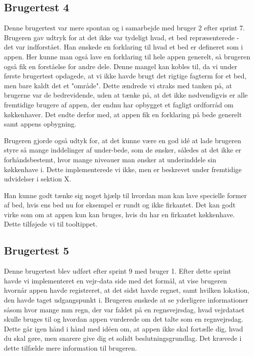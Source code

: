 \subsection{Brugertest 4}

Denne brugertest var mere spontan og i samarbejde med bruger 2 efter sprint 7. Brugeren gav udtryk for at det ikke var tydeligt hvad, et bed repræsenterede - det var indforstået. Han ønskede en forklaring til hvad et bed er defineret som i appen. Her kunne man også lave en forklaring til hele appen generelt, så brugeren også fik en forståelse for andre dele. Denne mangel kan kobles til, da vi under første brugertest opdagede, at vi ikke havde brugt det rigtige fagterm for et bed, men bare kaldt det et "område". Dette ændrede vi straks med tanken på, at brugerne var de bedrevidende, uden at tænke på, at det ikke nødvendigvis er alle fremtidige brugere af appen, der endnu har opbygget et fagligt ordforråd om køkkenhaver. Det endte derfor med, at appen fik en forklaring på bede generelt samt appens opbygning.

Brugeren gjorde også udtyk for, at det kunne være en god idé at lade brugeren styre så mange inddelinger af under-bede, som de ønsker, således at det ikke er forhåndsbestemt, hvor mange niveauer man ønsker at underinddele sin køkkenhave i. Dette implementerede vi ikke, men er beskrevet under fremtidige udvidelser i sektion X.

Han kunne godt tænke sig noget hjælp til hvordan man kan lave specielle former af bed, hvis ens bed nu for eksempel er rundt og ikke firkantet. Det kan godt virke som om at appen kun kan bruges, hvis du har en firkantet køkkenhave. Dette tilføjede vi til tooltippet.

\subsection{Brugertest 5}
Denne brugertest blev udført efter sprint 9 med bruger 1. Efter dette sprint havde vi implementeret en vejr-data side med det formål, at vise brugeren hvornår appen havde registreret, at det sidst havde regnet, samt hvilken lokation, den havde taget udgangspunkt i. Brugeren ønskede at se yderligere informationer såsom hvor mange mm regn, der var faldet på en regnsvejrsdag, hvad vejrdataet skulle bruges til og hvordan appen vurderede om det talte som en regnvejrsdag. Dette går igen hånd i hånd med idéen om, at appen ikke skal fortælle dig, hvad du skal gøre, men snarere give dig et solidt beslutningsgrundlag. Det krævede i dette tilfælde mere information til brugeren.

